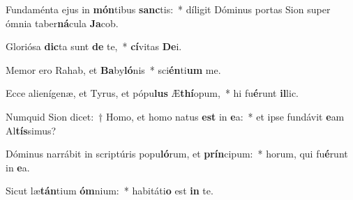 \item Fundaménta ejus in \textbf{món}tibus \textbf{sanc}tis:~* díligit Dóminus portas Sion super ómnia taber\textbf{ná}cula \textbf{Ja}cob.
\item Gloriósa \textbf{dic}ta sunt \textbf{de} te,~* \textbf{cí}vitas \textbf{De}i.
\item Memor ero Rahab, et \textbf{Ba}by\textbf{ló}nis~* sci\textbf{én}ti\textbf{um} me.
\item Ecce alienígenæ, et Tyrus, et pópu\textbf{lus} Æ\textbf{thí}opum,~* hi fu\textbf{é}runt \textbf{il}lic.
\item Numquid Sion dicet:~† Homo, et homo natus \textbf{est} in \textbf{e}a:~* et ipse fundávit \textbf{e}am Al\textbf{tís}simus?
\item Dóminus narrábit in scriptúris popu\textbf{ló}rum, et \textbf{prín}cipum:~* horum, qui fu\textbf{é}runt in \textbf{e}a.
\item Sicut læ\textbf{tán}tium \textbf{óm}nium:~* habitáti\textbf{o} est \textbf{in} te.

